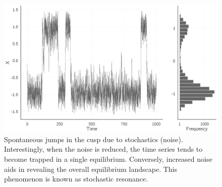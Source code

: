 \documentclass[
  a4paper,
  DIV=11,
  numbers=noendperiod,
  oneside]{scrreprt}
\newenvironment{Shaded}{\begin{snugshade}}{\end{snugshade}}
\newcommand{\AttributeTok}[1]{\textcolor[rgb]{0.40,0.45,0.13}{#1}}
\newcommand{\DecValTok}[1]{\textcolor[rgb]{0.68,0.00,0.00}{#1}}
\newcommand{\FunctionTok}[1]{\textcolor[rgb]{0.28,0.35,0.67}{#1}}
\newcommand{\NormalTok}[1]{\textcolor[rgb]{0.00,0.23,0.31}{#1}}
\newcommand{\OtherTok}[1]{\textcolor[rgb]{0.00,0.23,0.31}{#1}}
\newcommand{\SpecialCharTok}[1]{\textcolor[rgb]{0.37,0.37,0.37}{#1}}
\newcommand{\StringTok}[1]{\textcolor[rgb]{0.13,0.47,0.30}{#1}}
\begin{document}
\begin{Shaded}
\end{Shaded}

\begin{figure}

{\centering \includegraphics{media/ch4n/fig-ch4n-img2-old-50.jpg}

}

\caption{\label{fig-ch4n-img2-old-50}Spontaneous jumps in the cusp due
to stochastics (noise). Interestingly, when the noise is reduced, the
time series tends to become trapped in a single equilibrium. Conversely,
increased noise aids in revealing the overall equilibrium landscape.
This phenomenon is known as stochastic resonance.}

\end{figure}
\end{document}
